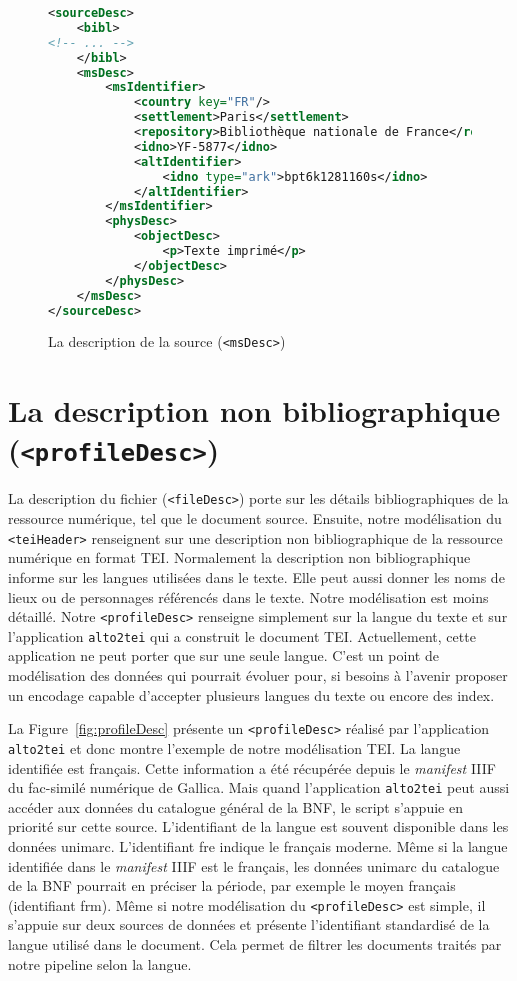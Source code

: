 \documentclass[class=article, crop=false]{standalone}
\begin{document}
\begin{figure}[htp]
\centering
\begin{lstlisting}[language=XML]
<sourceDesc>
	<bibl>
<!-- ... -->
	</bibl>
	<msDesc>
		<msIdentifier>
			<country key="FR"/>
			<settlement>Paris</settlement>
			<repository>Bibliothèque nationale de France</repository>
			<idno>YF-5877</idno>
			<altIdentifier>
				<idno type="ark">bpt6k1281160s</idno>
			</altIdentifier>
		</msIdentifier>
		<physDesc>
			<objectDesc>
				<p>Texte imprimé</p>
			</objectDesc>
		</physDesc>
	</msDesc>
</sourceDesc>

\end{lstlisting}
\caption{La description de la source (\texttt{<msDesc>})}
\label{fig:msDesc}
\end{figure}

\section{La description non bibliographique (\texttt{<profileDesc>})}
La description du fichier (\texttt{<fileDesc>}) porte sur les détails bibliographiques de la ressource numérique, tel que le document source. Ensuite, notre modélisation du \texttt{<teiHeader>} renseignent sur une description non bibliographique de la ressource numérique en format \acrshort{TEI}. Normalement la description non bibliographique informe sur les langues utilisées dans le texte. Elle peut aussi donner les noms de lieux ou de personnages référencés dans le texte. Notre modélisation est moins détaillé. Notre \texttt{<profileDesc>} renseigne simplement sur la langue du texte et sur l'application \texttt{alto2tei} qui a construit le document \acrshort{TEI}. Actuellement, cette application ne peut porter que sur une seule langue. C'est un point de modélisation des données qui pourrait évoluer pour, si besoins à l'avenir proposer un encodage capable d'accepter plusieurs langues du texte ou encore des index.

La Figure~\ref{fig:profileDesc} présente un \texttt{<profileDesc>} réalisé par l'application \texttt{alto2tei} et donc montre l'exemple de notre modélisation \acrshort{TEI}. La langue identifiée est français. Cette information a été récupérée depuis le \textit{manifest} \acrshort{IIIF} du fac-similé numérique de Gallica. Mais quand l'application \texttt{alto2tei} peut aussi accéder aux données du catalogue général de la \acrshort{BNF}, le script s'appuie en priorité sur cette source. L'identifiant de la langue est souvent disponible dans les données \Gls{unimarc}. L'identifiant \og{}fre\fg{} indique le français moderne. Même si la langue identifiée dans le \textit{manifest} \acrshort{IIIF} est le français, les données \Gls{unimarc} du catalogue de la \acrshort{BNF} pourrait en préciser la période, par exemple le moyen français (identifiant \og{}frm\fg{}). Même si notre modélisation du \texttt{<profileDesc>} est simple, il s'appuie sur deux sources de données et présente l'identifiant standardisé de la langue utilisé dans le document. Cela permet de filtrer les documents traités par notre pipeline selon la langue.
\end{document}
